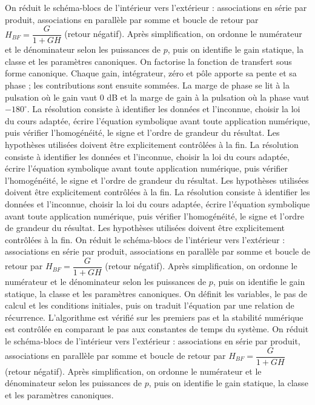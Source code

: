 \begin{corrigebox}[Corrigé]
On réduit le schéma-blocs de l'intérieur vers l'extérieur : associations en série par produit, associations en parallèle par somme et boucle de retour par $H_{BF}=\dfrac{G}{1+GH}$ (retour négatif). Après simplification, on ordonne le numérateur et le dénominateur selon les puissances de $p$, puis on identifie le gain statique, la classe et les paramètres canoniques.
On factorise la fonction de transfert sous forme canonique. Chaque gain, intégrateur, zéro et pôle apporte sa pente et sa phase ; les contributions sont ensuite sommées. La marge de phase se lit à la pulsation où le gain vaut $0$ dB et la marge de gain à la pulsation où la phase vaut $-180^\circ$.
La résolution consiste à identifier les données et l'inconnue, choisir la loi du cours adaptée, écrire l'équation symbolique avant toute application numérique, puis vérifier l'homogénéité, le signe et l'ordre de grandeur du résultat. Les hypothèses utilisées doivent être explicitement contrôlées à la fin.
La résolution consiste à identifier les données et l'inconnue, choisir la loi du cours adaptée, écrire l'équation symbolique avant toute application numérique, puis vérifier l'homogénéité, le signe et l'ordre de grandeur du résultat. Les hypothèses utilisées doivent être explicitement contrôlées à la fin.
La résolution consiste à identifier les données et l'inconnue, choisir la loi du cours adaptée, écrire l'équation symbolique avant toute application numérique, puis vérifier l'homogénéité, le signe et l'ordre de grandeur du résultat. Les hypothèses utilisées doivent être explicitement contrôlées à la fin.
On réduit le schéma-blocs de l'intérieur vers l'extérieur : associations en série par produit, associations en parallèle par somme et boucle de retour par $H_{BF}=\dfrac{G}{1+GH}$ (retour négatif). Après simplification, on ordonne le numérateur et le dénominateur selon les puissances de $p$, puis on identifie le gain statique, la classe et les paramètres canoniques.
On définit les variables, le pas de calcul et les conditions initiales, puis on traduit l'équation par une relation de récurrence. L'algorithme est vérifié sur les premiers pas et la stabilité numérique est contrôlée en comparant le pas aux constantes de temps du système.
On réduit le schéma-blocs de l'intérieur vers l'extérieur : associations en série par produit, associations en parallèle par somme et boucle de retour par $H_{BF}=\dfrac{G}{1+GH}$ (retour négatif). Après simplification, on ordonne le numérateur et le dénominateur selon les puissances de $p$, puis on identifie le gain statique, la classe et les paramètres canoniques.

\end{corrigebox}

